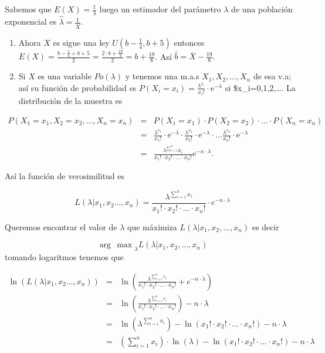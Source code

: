 \documentclass[]{article}
\begin{document}
Sabemos que \(E(X)=\frac{1}{\lambda}\) luego un estimador del parámetro
\(\lambda\) de una población exponencial es
\(\hat{\lambda}=\frac{1}{\overline{X}}.\)

\begin{enumerate}
\def\labelenumi{\arabic{enumi}.}
\setcounter{enumi}{4}
\item
  Ahora \(X\) es sigue una ley \(U(b-\frac{1}{4},b+5)\) entonces
  \(E(X)=\frac{b-\frac{1}{4}+b+5}{2}=\frac{2\cdot b+\frac{19}{4}}{2}=b+\frac{19}{8}\).
  Así \(\hat{b}=\overline{X}-\frac{19}{8}.\)
\item
  Si \(X\) es una variable \(Po(\lambda)\) y tenemos una m.a.s
  \(X_1,X_2,\ldots,X_n\) de esa v.a; así su función de probabilidad es
  \(P(X_i=x_i)=\frac{\lambda^{x_i}}{x_i!}\cdot \mathrm{e}^{-\lambda}\)
  si \$x\_i=0,1,2,\ldots. La distribución de la muestra es
\end{enumerate}

\[
\begin{array}{lll}
P\left(X_1=x_1,X_2=x_2,\ldots,X_n=x_n\right)&=& P(X_1=x_1)\cdot P(X_2=x_2)\cdot\ldots \cdot P(X_n=x_n)\\
&=&\frac{\lambda^{x_1}}{x_1!}\cdot \mathrm{e}^{-\lambda}\cdot \frac{\lambda^{x_2}}{x_2!}\cdot \mathrm{e}^{-\lambda}\cdot \ldots \frac{\lambda^{x_n}}{x_n!}\cdot \mathrm{e}^{-\lambda}\\
&=&\frac{\lambda^{\sum_{i=1}^n}x_i}{x_1!\cdot x_2!\cdot\ldots\cdot x_n!} \mathrm{e}^{-n\cdot \lambda}.
\end{array}
\]

Así la función de verosimilitud es

\[
L(\lambda| x_1,x_2\ldots,x_n)=\frac{\lambda^{\displaystyle\sum_{i=1}^n x_i}}{x_1!\cdot x_2!\cdot\ldots\cdot x_n!}\cdot e^{-n\cdot \lambda}
\]

Queremos encontrar el valor de \(\lambda\) que máximiza
\(L(\lambda| x_1,x_2,\ldots, x_n)\) es decir

\[{\arg\, \max}_{\lambda} L(\lambda| x_1,x_2,\ldots,x_n)\] tomando
logaritmos tenemos que

\[
\begin{array}{lll}
\ln\left(L(\lambda| x_1,x_2\ldots , x_n)\right) &=&\ln\left(\frac{\lambda^{\displaystyle\sum_{i=1}^n x_i}}{x_1!\cdot x_2!\cdot\ldots\cdot x_n!}+ e^{-n\cdot \lambda}\right)\\
&=& \ln\left(\frac{\lambda^{\displaystyle\sum_{i=1}^n x_i}}{x_1!\cdot x_2!\cdot\ldots\cdot x_n!}\right)-n\cdot \lambda\\ 
&=& \ln\left(\lambda^{\displaystyle\sum_{i=1}^n x_i}\right)-\ln\left(x_1!\cdot x_2!\cdot\ldots\cdot x_n!\right)-n\cdot \lambda\\
&=& \left(\sum_{i=1}^n x_i\right)\cdot \ln(\lambda)-\ln\left(x_1!\cdot x_2!\cdot\ldots\cdot x_n!\right)-n\cdot \lambda
\end{array}
\]
\end{document}
